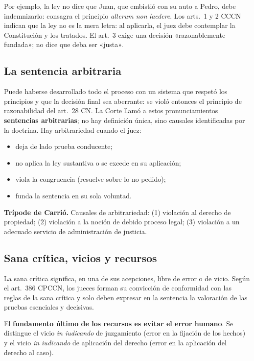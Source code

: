 \documentclass[12pt,oneside]{book}
\begin{document}
Por ejemplo, la ley no dice que Juan, que embistió con su auto a Pedro, debe indemnizarlo: consagra el principio \textit{alterum non laedere}. Los arts.~1 y 2 CCCN indican que la ley no es la mera letra: al aplicarla, el juez debe contemplar la Constitución y los tratados. El art.~3 exige una decisión «razonablemente fundada»; no dice que deba ser «justa».

\subsection{La sentencia arbitraria}

Puede haberse desarrollado todo el proceso con un sistema que respetó los principios y que la decisión final sea aberrante: se violó entonces el principio de razonabilidad del art.~28 CN. La Corte llamó a estos pronunciamientos \textbf{sentencias arbitrarias}; no hay definición única, sino causales identificadas por la doctrina. Hay arbitrariedad cuando el juez:

\begin{itemize}
\item deja de lado prueba conducente;
\item no aplica la ley sustantiva o se excede en su aplicación;
\item viola la congruencia (resuelve sobre lo no pedido);
\item funda la sentencia en su sola voluntad.
\end{itemize}

\begin{important}
\textbf{Trípode de Carrió.} Causales de arbitrariedad: (1) violación al derecho de propiedad; (2) violación a la noción de debido proceso legal; (3) violación a un adecuado servicio de administración de justicia.
\end{important}

\subsection{Sana crítica, vicios y recursos}

La sana crítica significa, en una de sus acepciones, libre de error o de vicio. Según el art.~386 CPCCN, los jueces forman su convicción de conformidad con las reglas de la sana crítica y solo deben expresar en la sentencia la valoración de las pruebas esenciales y decisivas.

El \textbf{fundamento último de los recursos es evitar el error humano}. Se distingue el vicio \textit{in iudicando} de juzgamiento (error en la fijación de los hechos) y el vicio \textit{in iudicando} de aplicación del derecho (error en la aplicación del derecho al caso). %
\end{document}
